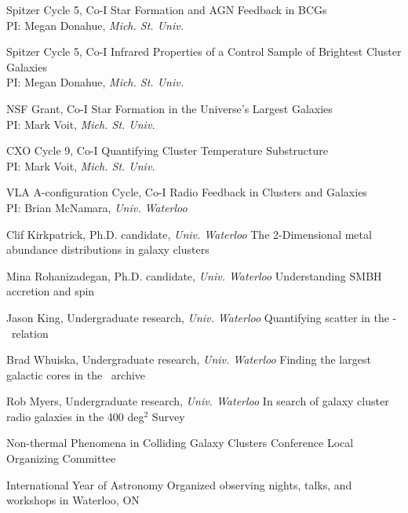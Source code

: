 \documentclass[11pt]{cv}
\begin{document}
\begin{llist}
Spitzer Cycle 5, Co-I
Star Formation and AGN Feedback in BCGs\\%
PI: Megan Donahue, {\textit{Mich. St. Univ.}}

Spitzer Cycle 5, Co-I
Infrared Properties of a Control Sample of Brightest Cluster Galaxies\\%
PI: Megan Donahue, {\textit{Mich. St. Univ.}}

NSF Grant, Co-I
Star Formation in the Universe's Largest Galaxies\\%
PI: Mark Voit, {\textit{Mich. St. Univ.}}

CXO Cycle 9, Co-I
Quantifying Cluster Temperature Substructure\\%
PI: Mark Voit, {\textit{Mich. St. Univ.}}

VLA A-configuration Cycle, Co-I
Radio Feedback in Clusters and Galaxies\\%
PI: Brian McNamara, {\textit{Univ. Waterloo}}


Clif Kirkpatrick, Ph.D. candidate, {\textit{Univ. Waterloo}}
The 2-Dimensional metal abundance distributions in galaxy clusters

Mina Rohanizadegan, Ph.D. candidate, {\textit{Univ. Waterloo}}
Understanding SMBH accretion and spin

Jason King, Undergraduate research, {\textit{Univ. Waterloo}}
Quantifying scatter in the \pjet-\prad\ relation

Brad Whuiska, Undergraduate research, {\textit{Univ. Waterloo}}
Finding the largest galactic cores in the \hst\ archive

Rob Myers, Undergraduate research, {\textit{Univ. Waterloo}}
In search of galaxy cluster radio galaxies in the 400 deg$^2$ Survey


Non-thermal Phenomena in Colliding Galaxy Clusters
Conference Local Organizing Committee

International Year of Astronomy
Organized observing nights, talks, and workshops in Waterloo, ON



\end{llist}
\end{document}
